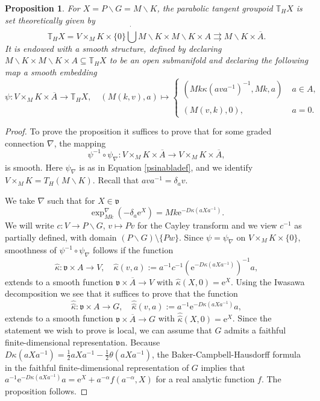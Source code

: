 \documentclass[10pt,a4paper]{amsart}
\newtheorem{prop}{Proposition}
\begin{document}
\begin{prop}
\label{lknadlnad}
For $X=P\backslash G=M\backslash K$, the parabolic tangent groupoid $\mathbb{T}_HX$ is set theoretically given by
$$\mathbb{T}_HX=V\times_M K\times \{0\}\dot{\bigcup} M\backslash K\times M\backslash K\times A\rightrightarrows M\backslash K \times \overline{A}.$$
It is endowed with a smooth structure, defined by declaring $M\backslash K\times M\backslash K\times A\subseteq \mathbb{T}_HX$ to be an open submanifold and declaring the following map a smooth embedding 
$$\psi:V\times_M K\times \overline{A}\to \mathbb{T}_HX, 
\quad 
(M(k,v),a)\mapsto\begin{cases}
(Mk\kappa(ava^{-1})^{-1},Mk,a)\; &a\in A,\\
{}\\
(M(v,k),0),\; &a=0.
\end{cases}$$
\end{prop}

\begin{proof}
To prove the proposition it suffices to prove that for some graded connection $\nabla$, the mapping
$$\psi^{-1}\circ \psi_\nabla:V\times_M K\times \overline{A}\to V\times_M K\times \overline{A},$$ 
is smooth. Here $\psi_\nabla$ is as in Equation \eqref{psinabladef}, and we identify $V\times_M K=T_H(M\backslash K)$. Recall that $ava^{-1}=\delta_av$. 

We take $\nabla$ such that for $X\in \mathfrak{v}$
$$\exp_{Mk}^\nabla(-\delta_a\mathrm{e}^{X})= Mk\mathrm{e}^{-D\kappa(aXa^{-1})}.$$
We will write $c:V\to P\backslash G$, $v\mapsto Pv$ for the Cayley transform and we view $c^{-1}$ as partially defined, with domain $(P\backslash G)\setminus \{Pw\}$. Since $\psi=\psi_\nabla$ on $V\times_M K\times\{0\}$, smoothness of $\psi^{-1}\circ \psi_\nabla$ follows if the function 
$$\hat{\kappa}:\mathfrak{v}\times A\to V, \quad \hat{\kappa}(v,a):= a^{-1}c^{-1}(\mathrm{e}^{-D\kappa(aXa^{-1})})^{-1}a,$$
extends to a smooth function $\mathfrak{v}\times \overline{A}\to V$ with $\hat{\kappa}(X,0)=\mathrm{e}^{X}$. Using the Iwasawa decomposition we see that it suffices to prove that the function 
$$\hat{\hat{\kappa}}:\mathfrak{v}\times A\to G, \quad \hat{\hat{\kappa}}(v,a):= a^{-1}\mathrm{e}^{-D\kappa(aXa^{-1})}a,$$
extends to a smooth function $\mathfrak{v}\times \overline{A}\to G$ with $\hat{\hat{\kappa}}(X,0)=\mathrm{e}^{X}$. Since the statement we wish to prove is local, we can assume that $G$ admits a faithful finite-dimensional representation. Because $D\kappa(aXa^{-1})=\frac{1}{2}aXa^{-1}-\frac{1}{2}\theta(aXa^{-1})$, the Baker-Campbell-Hausdorff formula in the faithful finite-dimensional representation of $G$ implies that $a^{-1}\mathrm{e}^{-D\kappa(aXa^{-1})}a=\mathrm{e}^X+a^{-\alpha}f(a^{-\alpha},X)$ for a real analytic function $f$. The proposition follows. 
\end{proof}
\end{document}
